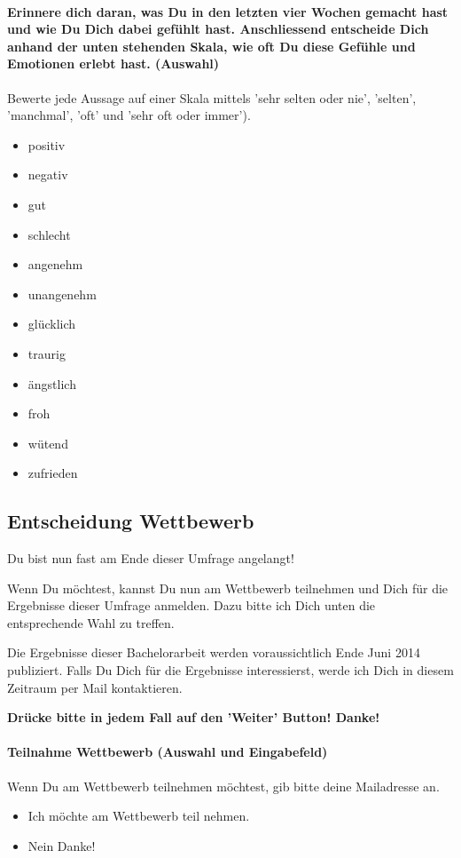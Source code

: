 \paragraph{Erinnere dich daran, was Du in den letzten vier Wochen gemacht hast und wie Du Dich dabei gefühlt hast. Anschliessend entscheide Dich anhand der unten stehenden Skala, wie oft Du diese Gefühle und Emotionen erlebt hast. (Auswahl)}
Bewerte jede Aussage auf einer Skala mittels 'sehr selten oder nie', 'selten', 'manchmal', 'oft' und 'sehr oft oder immer').
    \begin{itemize}
      \item positiv
      \item negativ
      \item gut
      \item schlecht
      \item angenehm
      \item unangenehm
      \item glücklich
      \item traurig      
      \item ängstlich
      \item froh
      \item wütend
      \item zufrieden
    \end{itemize}  
\subsection{Entscheidung Wettbewerb}\label{anhangSection.wettbewerb}   
Du bist nun fast am Ende dieser Umfrage angelangt!\par
Wenn Du möchtest, kannst Du nun am Wettbewerb teilnehmen und Dich für die Ergebnisse dieser Umfrage anmelden. Dazu bitte ich Dich unten die entsprechende Wahl zu treffen. \par
Die Ergebnisse dieser Bachelorarbeit werden voraussichtlich Ende Juni 2014 publiziert. Falls Du Dich für die Ergebnisse interessierst, werde ich Dich in diesem Zeitraum per Mail kontaktieren.\par
\textbf{Drücke bitte in jedem Fall auf den 'Weiter' Button! Danke!}
\paragraph{Teilnahme Wettbewerb (Auswahl und Eingabefeld)}
Wenn Du am Wettbewerb teilnehmen möchtest, gib bitte deine Mailadresse an.
    \begin{itemize}
      \item Ich möchte am Wettbewerb teil nehmen.
      \item Nein Danke!      
    \end{itemize}
